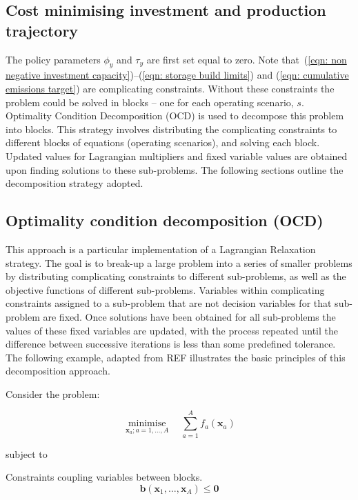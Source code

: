 \documentclass{article}
\newcommand{\iYear}{y}
\newcommand{\iScenario}{s}
\newcommand{\vBaseline}[1][\iYear]{\phi_{#1}}
\newcommand{\vPermitPrice}[1][\iYear]{\tau_{#1}}
\DeclareMathOperator*{\minimise}{minimise}
\begin{document}
\subsection{Cost minimising investment and production trajectory}
The policy parameters $\vBaseline$ and $\vPermitPrice$ are first set equal to zero. Note that~(\ref{eqn: non negative investment capacity})--(\ref{eqn: storage build limits}) and (\ref{eqn: cumulative emissions target}) are complicating constraints. Without these constraints the problem could be solved in blocks -- one for each operating scenario, $\iScenario$. Optimality Condition Decomposition (OCD) is used to decompose this problem into blocks. This strategy involves distributing the complicating constraints to different blocks of equations (operating scenarios), and solving each block. Updated values for Lagrangian multipliers and fixed variable values are obtained upon finding solutions to these sub-problems. The following sections outline the decomposition strategy adopted.

\subsection{Optimality condition decomposition (OCD)}
This approach is a particular implementation of a Lagrangian Relaxation strategy. The goal is to break-up a large problem into a series of smaller problems by distributing complicating constraints to different sub-problems, as well as the objective functions of different sub-problems. Variables within complicating constraints assigned to a sub-problem that are not decision variables for that sub-problem are fixed. Once solutions have been obtained for all sub-problems the values of these fixed variables are updated, with the process repeated until the difference between successive iterations is less than some predefined tolerance. The following example, adapted from REF illustrates the basic principles of this decomposition approach.

Consider the problem:

\begin{equation}
	\minimise\limits_{\bm{x}_{a}; a=1,\ldots, A} \quad \sum\limits_{a=1}^{A}f_{a}(\bm{x}_{a})
\end{equation}

subject to

Constraints coupling variables between blocks.
\begin{equation}
	\bm{b}\left(\bm{x}_{1}, \ldots, \bm{x}_{A}\right) \leq \bm{0}
	\label{eqn: complicating inequality constraint}
\end{equation}
\end{document}
